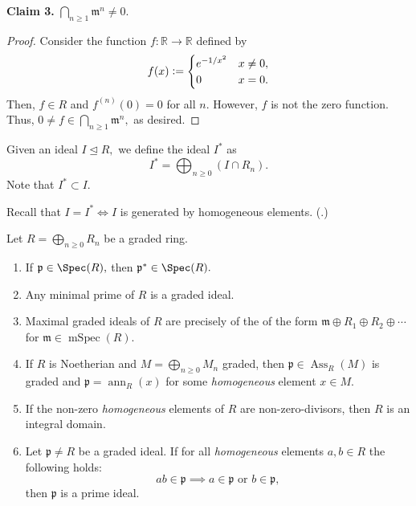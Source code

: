 \documentclass[12pt]{article}	%
\DeclareMathOperator{\Ass}{Ass}
\DeclareMathOperator{\mSpec}{mSpec}
\DeclareMathOperator{\ann}{ann}
\begin{document}
\begin{ex}
	\textbf{Claim 3.} $\bigcap_{n \ge 1}\mathfrak{m}^n \neq 0.$
	\begin{proof} 
		Consider the function $f : \mathbb{R} \to \mathbb{R}$ defined by
		\begin{equation*} 
			f(x) \vcentcolon= \begin{cases}
				e^{-1/x^2} & x \neq 0,\\
				0 & x = 0.
			\end{cases}
		\end{equation*}
		Then, $f \in R$ and $f^{(n)}(0) = 0$ for all $n.$ However, $f$ is not the zero function. Thus, $0 \neq f \in \bigcap_{n \ge 1}\mathfrak{m}^n,$ as desired.
	\end{proof}
\end{ex}

\begin{defn}%
	Given an ideal $I \unlhd R,$ we define the ideal $I^*$ as
	\begin{equation*} 
		I^* = \bigoplus_{n \ge 0} (I \cap R_n).
	\end{equation*}
	Note that $I^* \subset I.$
\end{defn}

Recall that $I = I^* \iff I$ is generated by homogeneous elements. (.)

\begin{prop}
	Let $R = \bigoplus_{n \ge 0}R_n$ be a graded ring.
	\begin{enumerate}
		\item If $\mathfrak{p} \in \Spec(R),$ then $\mathfrak{p}^* \in \Spec(R).$
		\item Any minimal prime of $R$ is a graded ideal.
		\item Maximal graded ideals of $R$ are precisely of the of the form $\mathfrak{m} \oplus R_1 \oplus R_2 \oplus \cdots$ for $\mathfrak{m} \in \mSpec(R).$
		\item If $R$ is Noetherian and $M = \bigoplus_{n \ge 0}M_n$ graded, then $\mathfrak{p} \in \Ass_R(M)$ is graded and $\mathfrak{p} = \ann_R(x)$ for some \emph{homogeneous} element $x \in M.$
		\item If the non-zero \emph{homogeneous} elements of $R$ are non-zero-divisors, then $R$ is an integral domain.
		\item Let $\mathfrak{p} \neq R$ be a graded ideal. If for all \emph{homogeneous} elements $a, b \in R$ the following holds:
		\begin{equation*} 
			ab \in \mathfrak{p} \implies a \in \mathfrak{p} \text{ or } b \in \mathfrak{p},
		\end{equation*}
		then $\mathfrak{p}$ is a prime ideal.
	\end{enumerate}
\end{prop}
\end{document}
